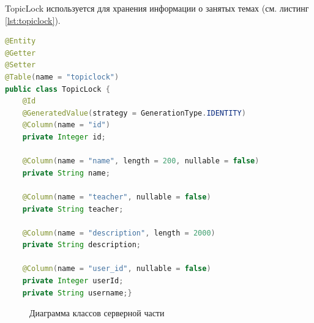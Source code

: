 \documentclass[14pt]{extarticle} %
\begin{document}
TopicLock используется для хранения информации о занятых темах (см. листинг \ref{lst:topiclock}).

\begin{lstlisting}[language=Java, caption={Сущность TopicLock}, label={lst:topiclock}]
@Entity
@Getter
@Setter
@Table(name = "topiclock")
public class TopicLock {
    @Id
    @GeneratedValue(strategy = GenerationType.IDENTITY)
    @Column(name = "id")
    private Integer id;

    @Column(name = "name", length = 200, nullable = false)
    private String name;

    @Column(name = "teacher", nullable = false)
    private String teacher;

    @Column(name = "description", length = 2000)
    private String description;

    @Column(name = "user_id", nullable = false)
    private Integer userId;
    private String username;}
\end{lstlisting}



\begin{figure}[h]
\centering
{}
\caption{Диаграмма классов серверной части}
\label{model}
\end{figure}
\end{document}
